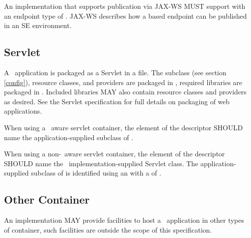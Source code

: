 An implementation that supports publication via JAX-WS MUST support  with an endpoint type of . JAX-WS describes how a  based endpoint can be published in an SE environment.

\subsection{Servlet}

A \jaxrs\ application is packaged as a Servlet in a  file. The  subclass (see section \ref{config}), resource classes, and providers are packaged in , required libraries are packaged in . Included libraries MAY also contain resource classes and providers as desired. See the Servlet specification for full details on packaging of web applications.

When using a \jaxrs\ aware servlet container, the  element of the  descriptor SHOULD name the application-supplied subclass of .

When using a non-\jaxrs\ aware servlet container, the  element of the  descriptor SHOULD name the \jaxrs\ implementation-supplied Servlet class. The application-supplied subclass of  is identified using an  with a  of .

\subsection{Other Container}

An implementation MAY provide facilities to host a \jaxrs\ application in other types of container, such facilities are outside the scope of this specification.